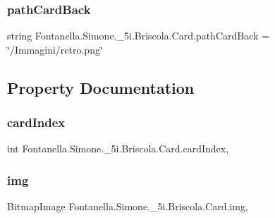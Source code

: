 \subsubsection{\texorpdfstring{path\+Card\+Back}{pathCardBack}}
{\footnotesize\ttfamily string Fontanella.\+Simone.\+\_\+5i.\+Briscola.\+Card.\+path\+Card\+Back = \char`\"{}/Immagini/retro.\+png\char`\"{}}



\subsection{Property Documentation}
\hypertarget{class_fontanella_1_1_simone_1_1__5i_1_1_briscola_1_1_card_a171a027469d728688df3f9172e04a3a0}{}\label{class_fontanella_1_1_simone_1_1__5i_1_1_briscola_1_1_card_a171a027469d728688df3f9172e04a3a0} 
\subsubsection{\texorpdfstring{card\+Index}{cardIndex}}
{\footnotesize\ttfamily int Fontanella.\+Simone.\+\_\+5i.\+Briscola.\+Card.\+card\+Index\hspace{0.3cm}{\ttfamily [get]}, {\ttfamily [set]}}

\hypertarget{class_fontanella_1_1_simone_1_1__5i_1_1_briscola_1_1_card_ae310d70e334b89c1feea95ca77d88633}{}\label{class_fontanella_1_1_simone_1_1__5i_1_1_briscola_1_1_card_ae310d70e334b89c1feea95ca77d88633} 
\subsubsection{\texorpdfstring{img}{img}}
{\footnotesize\ttfamily Bitmap\+Image Fontanella.\+Simone.\+\_\+5i.\+Briscola.\+Card.\+img\hspace{0.3cm}{\ttfamily [get]}, {\ttfamily [set]}}

\hypertarget{class_fontanella_1_1_simone_1_1__5i_1_1_briscola_1_1_card_a802c2936b18253d3341d82b9dd531f5a}{}\label{class_fontanella_1_1_simone_1_1__5i_1_1_briscola_1_1_card_a802c2936b18253d3341d82b9dd531f5a} 
